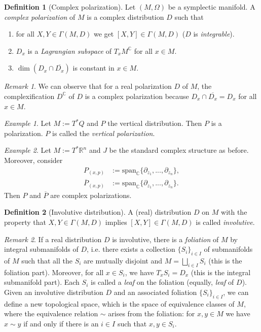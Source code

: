 \documentclass[11pt]{amsart}
\numberwithin{equation}{section}
\theoremstyle{plain}
\theoremstyle{definition}
\newtheorem{defn}{Definition}[subsection]
\theoremstyle{remark}
\newtheorem{rem}{Remark}[subsection]
\newtheorem{ex}{Example}[subsection]
\newcommand{\R}{\mathbb{R}}
\begin{document}
\begin{defn}[Complex polarization]
Let $(M,\Omega)$ be a symplectic manifold. A \emph{complex polarization} of $M$ is a complex distribution $D$ such that 
\begin{enumerate}
\item{for all $X,Y\in\Gamma(M,D)$ we get $[X,Y]\in\Gamma(M,D)$ ($D$ is \emph{integrable}).
}
\item{$D_x$ is a \emph{Lagrangian subspace} of $T_xM^\mathbb{C}$ for all $x\in M$.}
\item{$\dim(D_x\cap\overline{D_x})$ is constant in $x\in M$.}
\end{enumerate}
\end{defn}

\begin{rem}
We can observe that for a real polarization $D$ of $M$, the complexification $D^\mathbb{C}$ of $D$ is a complex polarization because $D_x\cap\overline{D_x}=D_x$ for all $x\in M$.
\end{rem}


\begin{ex}
Let $M:=T^*Q$ and $P$ the vertical distribution. Then $P$ is a polarization. $P$ is called the \emph{vertical polarization}.
\end{ex}

\begin{ex}
Let $M:=T^*\R^{n}$ and $J$ be the standard complex structure as before. Moreover, consider
\begin{align*}
   P_{(x,p)}&:=\mathrm{span}_\mathbb{C}\{\partial_{z_1},...,\partial_{z_n}\},\\
   \overline{P}_{(x,p)}&:=\mathrm{span}_\mathbb{C}\{\partial_{z_1},...,\partial_{z_n}\}.
\end{align*}
Then $P$ and $\overline{P}$ are complex polarizations.
\end{ex}

\begin{defn}[Involutive distribution]
A (real) distribution $D$ on $M$ with the property that $X,Y\in \Gamma(M,D)$ implies $[X,Y]\in\Gamma(M,D)$ is called \emph{involutive}.
\end{defn}

\begin{rem}
If a real distribution $D$ is involutive, there is a \emph{foliation} of $M$ by integral submanifolds of $D$, i.e. there exists a collection $\{S_i\}_{i\in I}$ of submanifolds of $M$ such that all the $S_i$ are mutually disjoint and $M=\bigsqcup_{i\in I}S_i$ (this is the foliation part). Moreover, for all $x\in S_i$, we have $T_xS_i=D_x$ (this is the integral submanifold part). Each $S_i$ is called a \emph{leaf} on the foliation (equally, \emph{leaf} of $D$). Given an involutive distribution $D$ and an associated foliation $\{S_i\}_{i\in I}$, we can define a new topological space, which is the space of equivalence classes of $M$, where the equivalence relation $\sim$ arises from the foliation: for $x,y\in M$ we have $x\sim y$ if and only if there is an $i\in I$ such that $x,y\in S_i$.
\end{rem}
\end{document}
